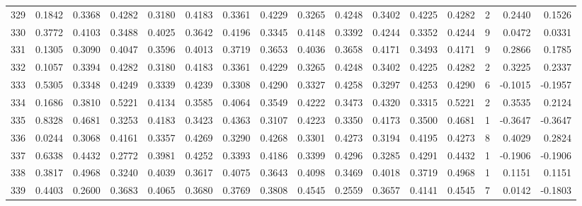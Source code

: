 \begin{tabular}{lrrrrrrrrrrrrrrr}
329 &      0.1842 &  0.3368 &  0.4282 &  0.3180 &  0.4183 &  0.3361 &  0.4229 &  0.3265 &  0.4248 &  0.3402 &   0.4225 &     0.4282 &      2 &                    0.2440 &                     0.1526 \\
330 &      0.3772 &  0.4103 &  0.3488 &  0.4025 &  0.3642 &  0.4196 &  0.3345 &  0.4148 &  0.3392 &  0.4244 &   0.3352 &     0.4244 &      9 &                    0.0472 &                     0.0331 \\
331 &      0.1305 &  0.3090 &  0.4047 &  0.3596 &  0.4013 &  0.3719 &  0.3653 &  0.4036 &  0.3658 &  0.4171 &   0.3493 &     0.4171 &      9 &                    0.2866 &                     0.1785 \\
332 &      0.1057 &  0.3394 &  0.4282 &  0.3180 &  0.4183 &  0.3361 &  0.4229 &  0.3265 &  0.4248 &  0.3402 &   0.4225 &     0.4282 &      2 &                    0.3225 &                     0.2337 \\
333 &      0.5305 &  0.3348 &  0.4249 &  0.3339 &  0.4239 &  0.3308 &  0.4290 &  0.3327 &  0.4258 &  0.3297 &   0.4253 &     0.4290 &      6 &                   -0.1015 &                    -0.1957 \\
334 &      0.1686 &  0.3810 &  0.5221 &  0.4134 &  0.3585 &  0.4064 &  0.3549 &  0.4222 &  0.3473 &  0.4320 &   0.3315 &     0.5221 &      2 &                    0.3535 &                     0.2124 \\
335 &      0.8328 &  0.4681 &  0.3253 &  0.4183 &  0.3423 &  0.4363 &  0.3107 &  0.4223 &  0.3350 &  0.4173 &   0.3500 &     0.4681 &      1 &                   -0.3647 &                    -0.3647 \\
336 &      0.0244 &  0.3068 &  0.4161 &  0.3357 &  0.4269 &  0.3290 &  0.4268 &  0.3301 &  0.4273 &  0.3194 &   0.4195 &     0.4273 &      8 &                    0.4029 &                     0.2824 \\
337 &      0.6338 &  0.4432 &  0.2772 &  0.3981 &  0.4252 &  0.3393 &  0.4186 &  0.3399 &  0.4296 &  0.3285 &   0.4291 &     0.4432 &      1 &                   -0.1906 &                    -0.1906 \\
338 &      0.3817 &  0.4968 &  0.3240 &  0.4039 &  0.3617 &  0.4075 &  0.3643 &  0.4098 &  0.3469 &  0.4018 &   0.3719 &     0.4968 &      1 &                    0.1151 &                     0.1151 \\
339 &      0.4403 &  0.2600 &  0.3683 &  0.4065 &  0.3680 &  0.3769 &  0.3808 &  0.4545 &  0.2559 &  0.3657 &   0.4141 &     0.4545 &      7 &                    0.0142 &                    -0.1803 \\

\end{tabular}
